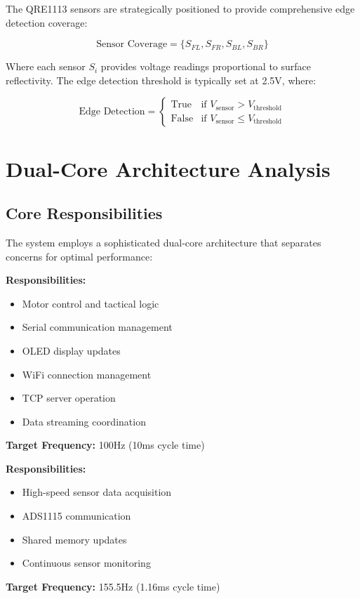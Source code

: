 \documentclass[12pt,a4paper]{article}
\begin{document}
The QRE1113 sensors are strategically positioned to provide comprehensive edge detection coverage:

\begin{equation}
\text{Sensor Coverage} = \{S_{FL}, S_{FR}, S_{BL}, S_{BR}\}
\end{equation}

Where each sensor $S_i$ provides voltage readings proportional to surface reflectivity. The edge detection threshold is typically set at 2.5V, where:

\begin{equation}
\text{Edge Detection} = \begin{cases}
\text{True} & \text{if } V_{\text{sensor}} > V_{\text{threshold}} \\
\text{False} & \text{if } V_{\text{sensor}} \leq V_{\text{threshold}}
\end{cases}
\end{equation}

\section{Dual-Core Architecture Analysis}

\subsection{Core Responsibilities}

The system employs a sophisticated dual-core architecture that separates concerns for optimal performance:

\begin{tcolorbox}[colback=green!5!white,colframe=green!75!black,title=Core 0 (Primary Core)]
\textbf{Responsibilities:}
\begin{itemize}
    \item Motor control and tactical logic
    \item Serial communication management
    \item OLED display updates
    \item WiFi connection management
    \item TCP server operation
    \item Data streaming coordination
\end{itemize}
\textbf{Target Frequency:} 100Hz (10ms cycle time)
\end{tcolorbox}

\begin{tcolorbox}[colback=orange!5!white,colframe=orange!75!black,title=Core 1 (Secondary Core)]
\textbf{Responsibilities:}
\begin{itemize}
    \item High-speed sensor data acquisition
    \item ADS1115 communication
    \item Shared memory updates
    \item Continuous sensor monitoring
\end{itemize}
\textbf{Target Frequency:} 155.5Hz (1.16ms cycle time)
\end{tcolorbox}
\end{document}
